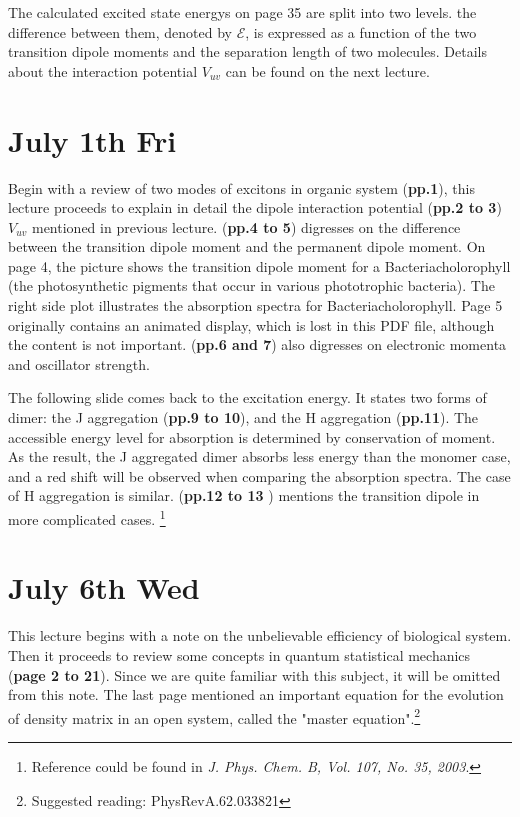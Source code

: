 \documentclass{article}
\numberwithin{equation}{subsection} %
\theoremstyle{definition}
\begin{document}
The calculated excited state energys on page 35 are split into
two levels. the difference between them, denoted by $\mathcal{E}$,
is expressed as a function of the two
transition dipole moments and the separation length of two molecules.
Details about the interaction potential $V_{uv}$ can be found on
the next lecture.

\section{July 1th Fri}
\label{sec:July_1th}
Begin with a review of two modes of excitons in organic system
(\textbf{pp.1}), this
lecture proceeds to explain in detail the dipole interaction potential
(\textbf{pp.2 to 3})
$V_{uv}$ mentioned in previous lecture. (\textbf{pp.4 to 5}) digresses on
the difference between the transition dipole moment and the
permanent dipole moment. On page 4, the picture shows the transition dipole
moment for a Bacteriacholorophyll (the photosynthetic pigments that 
occur in various phototrophic bacteria). The right side plot illustrates
the absorption spectra for Bacteriacholorophyll. Page 5 originally
contains an animated display, which is lost in this PDF file, although
the content is not important.
(\textbf{pp.6 and 7}) also digresses on electronic momenta and oscillator
strength. 

The following slide comes back to the excitation energy. It states two
forms of dimer: the J aggregation (\textbf{pp.9 to 10}), and the H
aggregation (\textbf{pp.11}). The accessible energy level for absorption
is determined by conservation of moment. As the result, the J aggregated
dimer absorbs less energy than the monomer case, and a red shift will be
observed when comparing the absorption spectra. The case of H aggregation
is similar. (\textbf{pp.12 to 13 }) mentions the transition dipole in
more complicated cases. \footnote{Reference could be found in \textit{
J. Phys. Chem. B, Vol. 107, No. 35, 2003}.}

\section{July 6th Wed}
\label{sec:July_6th}
This lecture begins with a note on the unbelievable efficiency of biological
system. Then it proceeds to review some concepts in quantum statistical 
mechanics (\textbf{page 2 to 21}). Since we are quite familiar with this
subject, it will be omitted from this note. The last page mentioned an
important equation for the evolution of density matrix in an open system,
called the "master equation".\footnote{Suggested reading: 
PhysRevA.62.033821}
\end{document}

